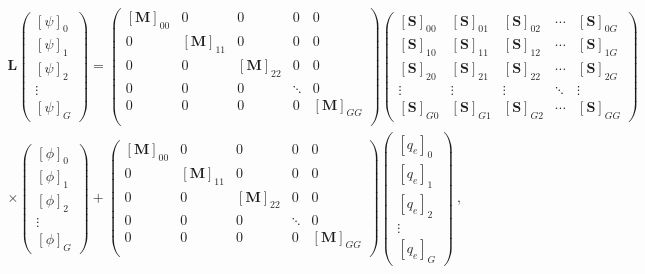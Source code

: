 \documentclass[12pt,twoside]{article}
\newcommand{\ve}[1]{\ensuremath{\mathbf{#1}}}
\begin{document}
\begin{multline}
    \ve{L}
    \begin{pmatrix}
      [\psi]_0 \\
      [\psi]_1 \\
      [\psi]_2 \\
      \vdots   \\
      [\psi]_G
    \end{pmatrix} =
    \begin{pmatrix}
      [\ve{M}]_{00} & 0 & 0 & 0 & 0 \\
      0 & [\ve{M}]_{11} & 0 & 0 & 0 \\
      0 & 0 & [\ve{M}]_{22} & 0 & 0 \\
      0 & 0 & 0 & \ddots & 0 \\
      0 & 0 & 0 & 0 & [\ve{M}]_{GG} \\
    \end{pmatrix}
    \begin{pmatrix}
      [\ve{S}]_{00} & [\ve{S}]_{01} & [\ve{S}]_{02} & \cdots &
      [\ve{S}]_{0G} \\
      [\ve{S}]_{10} & [\ve{S}]_{11} & [\ve{S}]_{12} & \cdots &
      [\ve{S}]_{1G} \\
      [\ve{S}]_{20} & [\ve{S}]_{21} & [\ve{S}]_{22} & \cdots &
      [\ve{S}]_{2G} \\
      \vdots & \vdots & \vdots & \ddots & \vdots \\
      [\ve{S}]_{G0} & [\ve{S}]_{G1} & [\ve{S}]_{G2} & \cdots &
      [\ve{S}]_{GG}
    \end{pmatrix}\\
    \times
    \begin{pmatrix}
      [\phi]_0 \\
      [\phi]_1 \\
      [\phi]_2 \\
      \vdots   \\
      [\phi]_G
    \end{pmatrix}
    +
    \begin{pmatrix}
      [\ve{M}]_{00} & 0 & 0 & 0 & 0 \\
      0 & [\ve{M}]_{11} & 0 & 0 & 0 \\
      0 & 0 & [\ve{M}]_{22} & 0 & 0 \\
      0 & 0 & 0 & \ddots & 0 \\
      0 & 0 & 0 & 0 & [\ve{M}]_{GG} \\
    \end{pmatrix}
    \begin{pmatrix}
      [q_e]_0 \\
      [q_e]_1 \\
      [q_e]_2 \\
      \vdots   \\
      [q_e]_G
    \end{pmatrix}\:,
    \label{eq:matrix-transport}
\end{multline}
\end{document}
